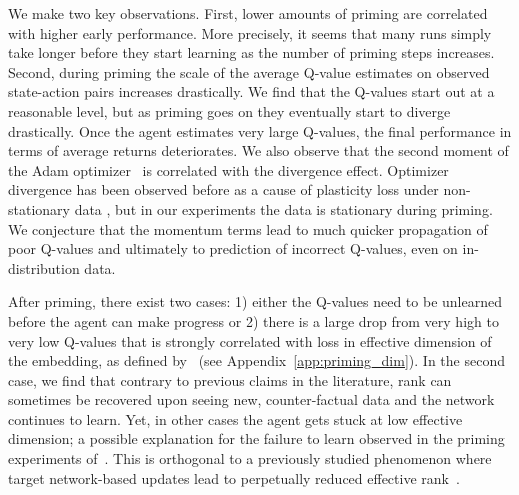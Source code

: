 We make two key observations. First, lower amounts of priming are correlated with higher early performance. More precisely, it seems that many runs simply take longer before they start learning as the number of priming steps increases. Second, during priming the scale of the average Q-value estimates on observed state-action pairs increases drastically. We find that the Q-values start out at a reasonable level, but as priming goes on they eventually start to diverge drastically. Once the agent estimates very large Q-values, the final performance in terms of average returns deteriorates. We also observe that the second moment of the Adam optimizer~\parencite{kingma2015adam} is correlated with the divergence effect. Optimizer divergence has been observed before as a cause of plasticity loss under non-stationary data \parencite{lyle2023understanding}, but in our experiments the data is stationary during priming. We conjecture that the momentum terms lead to much quicker propagation of poor Q-values and ultimately to prediction of incorrect Q-values, even on in-distribution data.


After priming, there exist two cases: 1) either the Q-values need to be unlearned before the agent can make progress or 2) there is a large drop from very high to very low Q-values that is strongly correlated with loss in effective dimension of the embedding, as defined by~\cite{yang2020harnessing} (see Appendix~\ref{app:priming_dim}). In the second case, we find that contrary to previous claims in the literature, rank can sometimes be recovered upon seeing new, counter-factual data and the network continues to learn. Yet, in other cases the agent gets stuck at low effective dimension; a possible explanation for the failure to learn observed in the priming experiments of~\textcite{nikishin2022primacy}. This is orthogonal to a previously studied phenomenon where target network-based updates lead to perpetually reduced effective rank~\parencite{kumar2021implicit}.


